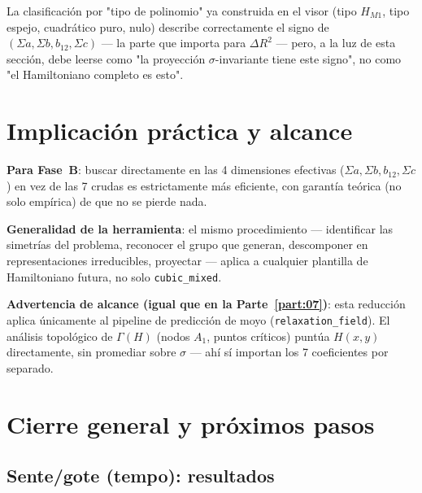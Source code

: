 \documentclass[11pt, a4paper]{article}
\begin{document}
La clasificaci\'on por "tipo de polinomio" ya construida en el visor
(tipo $H_{M1}$, tipo espejo, cuadr\'atico puro, nulo) describe
correctamente el signo de $(\Sigma a,\Sigma b,b_{12},\Sigma c)$ ---
la parte que importa para $\Delta R^2$ --- pero, a la luz de esta
secci\'on, debe leerse como "la proyecci\'on $\sigma$-invariante tiene
este signo", no como "el Hamiltoniano completo es esto".

\section{Implicaci\'on pr\'actica y alcance}

\textbf{Para Fase~B}: buscar directamente en las 4 dimensiones
efectivas ($\Sigma a,\Sigma b,b_{12},\Sigma c$) en vez de las 7 crudas
es estrictamente m\'as eficiente, con garant\'ia te\'orica (no solo
emp\'irica) de que no se pierde nada.

\textbf{Generalidad de la herramienta}: el mismo procedimiento ---
identificar las simetr\'ias del problema, reconocer el grupo que
generan, descomponer en representaciones irreducibles, proyectar ---
aplica a cualquier plantilla de Hamiltoniano futura, no solo
\texttt{cubic\_mixed}.

\begin{tcolorbox}[quotebox]
  \textbf{Advertencia de alcance (igual que en la Parte~\ref{part:07})}:
  esta reducci\'on aplica \'unicamente al pipeline de predicci\'on de
  moyo (\texttt{relaxation\_field}). El an\'alisis topol\'ogico de
  $\Gamma(H)$ (nodos $A_1$, puntos cr\'iticos) punt\'ua $H(x,y)$
  directamente, sin promediar sobre $\sigma$ --- ah\'i s\'i importan
  los 7 coeficientes por separado.
\end{tcolorbox}

\section{Cierre general y pr\'oximos pasos}
\label{sec:cierre}

\subsection{Sente/gote (tempo): resultados}
\label{sec:sente-gote}
\end{document}
